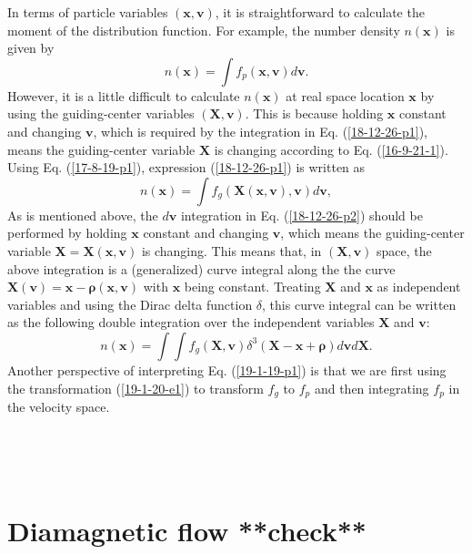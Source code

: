 \documentclass{article}
\newcommand{\tmmathbf}[1]{\ensuremath{\boldsymbol{#1}}}
\begin{document}
In terms of particle variables $(\mathbf{x}, \mathbf{v})$, it is
straightforward to calculate the moment of the distribution function. For
example, the number density $n (\mathbf{x})$ is given by
\begin{equation}
  \label{18-12-26-p1} n (\mathbf{x}) = \int f_p (\mathbf{x}, \mathbf{v})
  d\mathbf{v}.
\end{equation}
However, it is a little difficult to calculate $n (\mathbf{x})$ at real space
location $\mathbf{x}$ by using the guiding-center variables $(\mathbf{X},
\mathbf{v})$. This is because holding $\mathbf{x}$ constant and changing
$\mathbf{v}$, which is required by the integration in Eq. (\ref{18-12-26-p1}),
means the guiding-center variable $\mathbf{X}$ is changing according to Eq.
(\ref{16-9-21-1}). Using Eq. (\ref{17-8-19-p1}), expression
(\ref{18-12-26-p1}) is written as
\begin{equation}
  \label{18-12-26-p2} n (\mathbf{x}) = \int f_g (\mathbf{X} (\mathbf{x},
  \mathbf{v}), \mathbf{v}) d\mathbf{v},
\end{equation}
As is mentioned above, the $d\mathbf{v}$ integration in Eq.
(\ref{18-12-26-p2}) should be performed by holding $\mathbf{x}$ constant and
changing $\mathbf{v}$, which means the guiding-center variable
$\mathbf{X}=\mathbf{X} (\mathbf{x}, \mathbf{v})$ is changing. This means that,
in $(\mathbf{X}, \mathbf{v})$ space, the above integration is a (generalized)
curve integral along the the curve \ $\mathbf{X} (\mathbf{v})
=\mathbf{x}-\tmmathbf{\rho} (\mathbf{x}, \mathbf{v})$ with $\mathbf{x}$ being
constant. Treating $\mathbf{X}$ and $\mathbf{x}$ as independent variables and
using the Dirac delta function $\delta$, this curve integral can be written as
the following double integration over the independent variables $\mathbf{X}$
and $\mathbf{v}$:
\begin{equation}
  \label{19-1-19-p1} n (\mathbf{x}) = \int \int f_g (\mathbf{X}, \mathbf{v})
  \delta^3 (\mathbf{X}-\mathbf{x}+\tmmathbf{\rho}) d\mathbf{v}d\mathbf{X}.
\end{equation}
Another perspective of interpreting Eq. (\ref{19-1-19-p1}) is that we are
first using the transformation (\ref{19-1-20-e1}) to transform $f_g$ to $f_p$
and then integrating $f_p$ in the velocity space.

\

\

\section{Diamagnetic flow **check**}\label{17-9-26-1}\label{17-8-19-e1}
\end{document}
